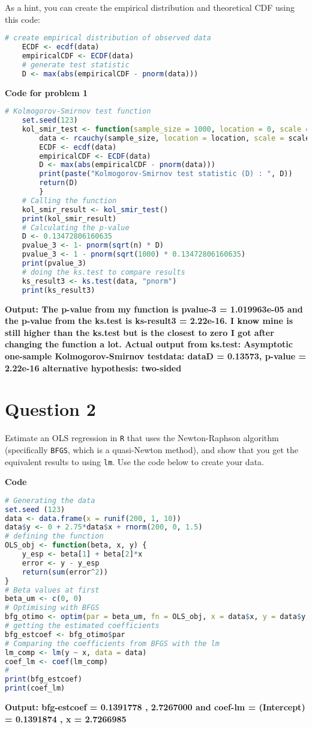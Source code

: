 \documentclass[12pt,letterpaper]{article}
\begin{document}
	
\noindent As a hint, you can create the empirical distribution and theoretical CDF using this code:



\begin{lstlisting}[language=R]
	# create empirical distribution of observed data
	ECDF <- ecdf(data)
	empiricalCDF <- ECDF(data)
	# generate test statistic
	D <- max(abs(empiricalCDF - pnorm(data))) \end{lstlisting}
\textbf{Code for problem 1}
\begin{lstlisting}[language=R]
	# Kolmogorov-Smirnov test function
	set.seed(123)
	kol_smir_test <- function(sample_size = 1000, location = 0, scale = 1) {  
		data <- rcauchy(sample_size, location = location, scale = scale)  
		ECDF <- ecdf(data)  
		empiricalCDF <- ECDF(data)  
		D <- max(abs(empiricalCDF - pnorm(data)))  
		print(paste("Kolmogorov-Smirnov test statistic (D) : ", D))  
		return(D)
		}
	# Calling the function
	kol_smir_result <- kol_smir_test() 
	print(kol_smir_result)
	# Calculating the p-value 
	D <- 0.13472806160635
	pvalue_3 <- 1- pnorm(sqrt(n) * D)
	pvalue_3 <- 1 - pnorm(sqrt(1000) * 0.13472806160635)
	print(pvalue_3)
	# doing the ks.test to compare results
	ks_result3 <- ks.test(data, "pnorm")
	print(ks_result3)
\end{lstlisting}	
\textbf{Output: The p-value from my function is pvalue-3 = 1.019963e-05 and the p-value from the ks.test is ks-result3 = 2.22e-16. I know mine is still higher than the ks.test but is the closest to zero I got after changing the function a lot.
Actual output from ks.test: Asymptotic one-sample Kolmogorov-Smirnov testdata:  dataD = 0.13573, p-value = 2.22e-16 
alternative hypothesis: two-sided}
\vspace{3in}

\section*{Question 2}
\noindent Estimate an OLS regression in \texttt{R} that uses the Newton-Raphson algorithm (specifically \texttt{BFGS}, which is a quasi-Newton method), and show that you get the equivalent results to using \texttt{lm}. Use the code below to create your data.
\vspace{.5cm}
 
\textbf{Code}
\begin{lstlisting}[language=R]
# Generating the data
set.seed (123)
data <- data.frame(x = runif(200, 1, 10))
data$y <- 0 + 2.75*data$x + rnorm(200, 0, 1.5)
# defining the function
OLS_obj <- function(beta, x, y) {  
	y_esp <- beta[1] + beta[2]*x  
	error <- y - y_esp  
	return(sum(error^2))
}
# Beta values at first
beta_um <- c(0, 0)
# Optimising with BFGS
bfg_otimo <- optim(par = beta_um, fn = OLS_obj, x = data$x, y = data$y, method = "BFGS")
# getting the estimated coefficients 
bfg_estcoef <- bfg_otimo$par
# Comparing the coefficients from BFGS with the lm
lm_comp <- lm(y ~ x, data = data)
coef_lm <- coef(lm_comp)
#
print(bfg_estcoef)
print(coef_lm)
\end{lstlisting}	
\textbf{Output: bfg-estcoef =  0.1391778 ,  2.7267000 
 and coef-lm = (Intercept) = 0.1391874 , x =  2.7266985} 
\end{document}
